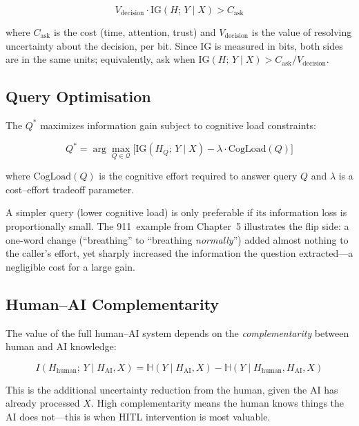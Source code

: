 \[
V_\text{decision} \cdot \text{IG}(H;\, Y \mid X) > C_\text{ask}
\]

where $C_\text{ask}$ is the cost (time, attention, trust) and $V_\text{decision}$ is the value of resolving uncertainty about the decision, per bit. Since IG is measured in bits, both sides are in the same units; equivalently, ask when $\text{IG}(H;\, Y \mid X) > C_\text{ask}/V_\text{decision}$.

\subsection{Query Optimisation}

The  $Q^*$ maximizes information gain subject to cognitive load constraints:

\[
Q^* = \arg\max_{Q \in \mathcal{Q}} \bigl[\text{IG}(H_Q;\, Y \mid X) - \lambda \cdot \text{CogLoad}(Q)\bigr]
\]

where $\text{CogLoad}(Q)$ is the cognitive effort required to answer query $Q$ and $\lambda$ is a cost--effort tradeoff parameter.

\begin{examplebox}
A simpler query (lower cognitive load) is only preferable if its information loss is proportionally small. The 911~example from Chapter~5 illustrates the flip side: a one-word change (``breathing'' to ``breathing \emph{normally}'') added almost nothing to the caller's effort, yet sharply increased the information the question extracted---a negligible cost for a large gain.
\end{examplebox}

\subsection{Human--AI Complementarity}

The value of the full human--AI system depends on the \emph{complementarity} between human and AI knowledge:

\[
I(H_\text{human};\, Y \mid H_\text{AI}, X) = \mathbb{H}(Y \mid H_\text{AI}, X) - \mathbb{H}(Y \mid H_\text{human}, H_\text{AI}, X)
\]

This is the additional uncertainty reduction from the human, given the AI has already processed $X$. High complementarity means the human knows things the AI does not---this is when HITL intervention is most valuable.

